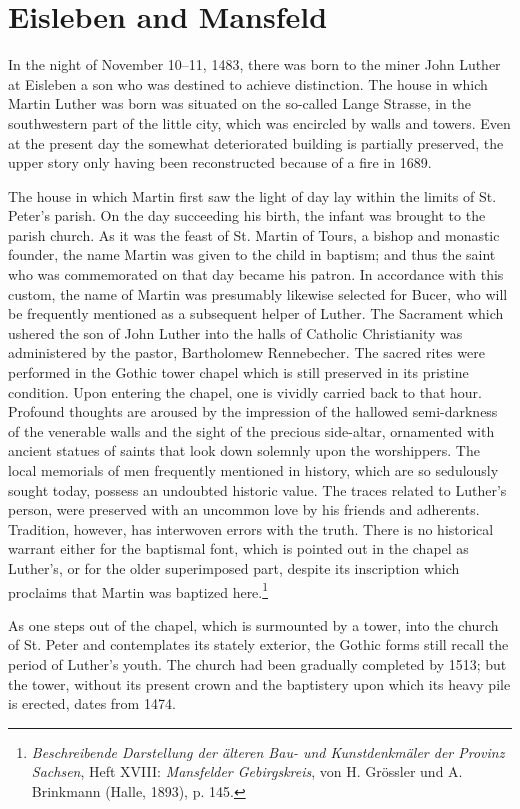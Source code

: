\section{Eisleben and Mansfeld}

In the night of November 10--11, 1483, there was born to the miner
John Luther at Eisleben a son who was destined to achieve distinction.
The house in which Martin Luther was born was situated on the so-called
Lange Strasse, in the southwestern part of the little city, which
was encircled by walls and towers. Even at the present day the
somewhat deteriorated building is partially preserved, the upper story only
having been reconstructed because of a fire in 1689.

The house in which Martin first saw the light of day lay within the
limits of St. Peter’s parish. On the day succeeding his birth, the infant
was brought to the parish church. As it was the feast of St. Martin of
Tours, a bishop and monastic founder, the name Martin was given
to the child in baptism; and thus the saint who was commemorated on that day became his patron. In accordance with this custom,
the name of Martin was presumably likewise selected for Bucer, who
will be frequently mentioned as a subsequent helper of Luther. The
Sacrament which ushered the son of John Luther into the halls of Catholic Christianity was administered by the pastor, Bartholomew Rennebecher.
The sacred rites were performed in the Gothic tower chapel
which is still preserved in its pristine condition. Upon entering the
chapel, one is vividly carried back to that hour. Profound thoughts are
aroused by the impression of the hallowed semi-darkness of the venerable walls and the sight of the precious side-altar, ornamented with
ancient statues of saints that look down solemnly upon the worshippers.
The local memorials of men frequently mentioned in history, which are
so sedulously sought today, possess an undoubted historic value. The
traces related to Luther’s person, were preserved with an uncommon
love by his friends and adherents. Tradition, however, has interwoven
errors with the truth. There is no historical warrant either for the baptismal font, which is pointed out in the chapel as Luther’s, or for the older superimposed part, despite its inscription which proclaims that
Martin was baptized here.\footnote{\textit{Beschreibende Darstellung der älteren Bau- und Kunstdenkmäler der Provinz Sachsen}, Heft XVIII: \textit{Mansfelder Gebirgskreis}, von H. Grössler und A. Brinkmann (Halle, 1893), p. 145.}

As one steps out of the chapel, which is surmounted by a tower, into
the church of St. Peter and contemplates its stately exterior, the Gothic
forms still recall the period of Luther’s youth. The church had been
gradually completed by 1513; but the tower, without its present
crown and the baptistery upon which its heavy pile is erected, dates
from 1474.


